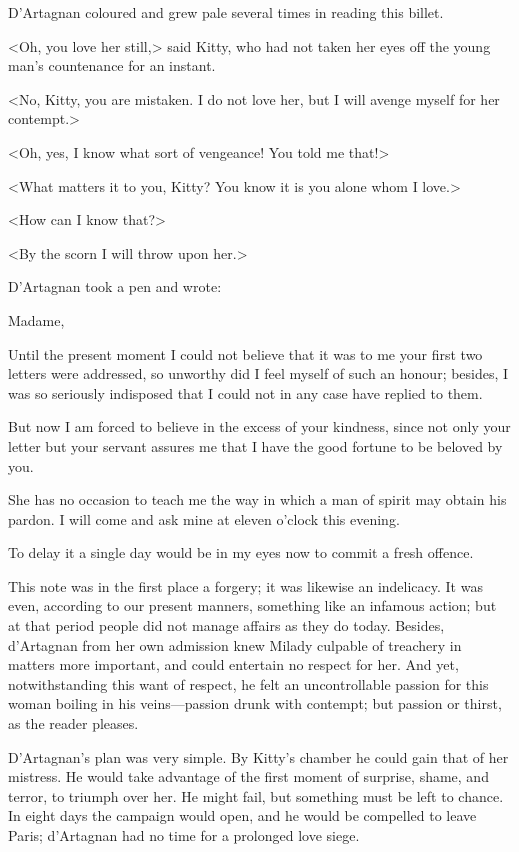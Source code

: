 D'Artagnan coloured and grew pale several times in reading this billet. 

<Oh, you love her still,> said Kitty, who had not taken her eyes off the young man's countenance for an instant. 

<No, Kitty, you are mistaken. I do not love her, but I will avenge myself for her contempt.> 

<Oh, yes, I know what sort of vengeance! You told me that!> 

<What matters it to you, Kitty? You know it is you alone whom I love.> 

<How can I know that?> 

<By the scorn I will throw upon her.> 

D'Artagnan took a pen and wrote: 

\begin{mail}{}{Madame,}
	
Until the present moment I could not believe that it was to me your first two letters were addressed, so unworthy did I feel myself of such an honour; besides, I was so seriously indisposed that I could not in any case have replied to them.

But now I am forced to believe in the excess of your kindness, since not only your letter but your servant assures me that I have the good fortune to be beloved by you.

She has no occasion to teach me the way in which a man of spirit may obtain his pardon. I will come and ask mine at eleven o'clock this evening.

To delay it a single day would be in my eyes now to commit a fresh offence.

\end{mail}

This note was in the first place a forgery; it was likewise an indelicacy. It was even, according to our present manners, something like an infamous action; but at that period people did not manage affairs as they do today. Besides, d'Artagnan from her own admission knew Milady culpable of treachery in matters more important, and could entertain no respect for her. And yet, notwithstanding this want of respect, he felt an uncontrollable passion for this woman boiling in his veins---passion drunk with contempt; but passion or thirst, as the reader pleases. 

D'Artagnan's plan was very simple. By Kitty's chamber he could gain that of her mistress. He would take advantage of the first moment of surprise, shame, and terror, to triumph over her. He might fail, but something must be left to chance. In eight days the campaign would open, and he would be compelled to leave Paris; d'Artagnan had no time for a prolonged love siege. 

